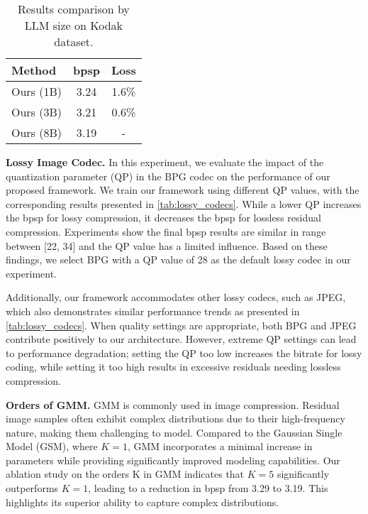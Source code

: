 \begin{table}[t]
\tabcolsep=0.3cm
    \centering
    \begin{tabular}{lcc}
    \toprule[2pt]
    Method & bpsp & Loss\\ 
    \midrule[1pt]
    Ours (1B)    &3.24 &1.6\%\\
    Ours (3B)    &3.21 &0.6\%\\
    Ours (8B)    &3.19 &-\\
    \bottomrule[2pt]
    \end{tabular}
    \caption{Results comparison by LLM size on Kodak dataset.}
    \label{tab:model_size}
\end{table}

\textbf{Lossy Image Codec.}
In this experiment, we evaluate the impact of the quantization parameter (QP) in the BPG codec on the performance of our proposed framework. We train our framework using different QP values, with the corresponding results presented in \cref{tab:lossy_codecs}. While a lower QP increases the bpsp for lossy compression, it decreases the bpsp for lossless residual compression. Experiments show the final bpsp results are similar in range between [22, 34] and the QP value has a limited influence. Based on these findings, we select BPG with a QP value of 28 as the default lossy codec in our experiment. 

Additionally, our framework accommodates other lossy codecs, such as JPEG, which also demonstrates similar performance trends as presented in \cref{tab:lossy_codecs}. When quality settings are appropriate, both BPG and JPEG contribute positively to our architecture. However, extreme QP settings can lead to performance degradation; setting the QP too low increases the bitrate for lossy coding, while setting it too high results in excessive residuals needing lossless compression.

\textbf{Orders of GMM.}
GMM is commonly used in image compression\cite{Cheng_2020_CVPR_DGML, bai2024deep}. Residual image samples often exhibit complex distributions due to their high-frequency nature, making them challenging to model. Compared to the Gaussian Single Model (GSM), where $K=1$, GMM incorporates a minimal increase in parameters while providing significantly improved modeling capabilities. Our ablation study on the orders K in GMM indicates that $K=5$ significantly outperforms $K=1$, leading to a reduction in bpsp from 3.29 to 3.19. This highlights its superior ability to capture complex distributions. 

